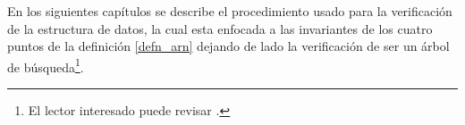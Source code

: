 En los siguientes capítulos se describe el procedimiento usado para la verificaci\'on de la
estructura de datos, la cual esta enfocada a las invariantes de los cuatro puntos de la definici\'on
 \ref{defn_arn} dejando de lado la verificaci\'on de ser un \'arbol de b\'usqueda\footnote{El lector
  interesado puede revisar \cite{appel}.}.
